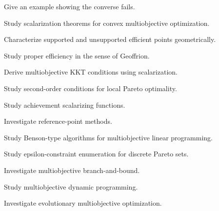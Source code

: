 \begin{exercise}[4]
Give an example showing the converse fails.
\end{exercise}

\begin{exercise}[4]
Study scalarization theorems for convex multiobjective optimization.
\end{exercise}

\begin{exercise}[4]
Characterize supported and unsupported efficient points geometrically.
\end{exercise}

\begin{exercise}[4]
Study proper efficiency in the sense of Geoffrion.
\end{exercise}

\begin{exercise}[4]
Derive multiobjective KKT conditions using scalarization.
\end{exercise}

\begin{exercise}[4]
Study second-order conditions for local Pareto optimality.
\end{exercise}

\begin{exercise}[4]
Study achievement scalarizing functions.
\end{exercise}

\begin{exercise}[4]
Investigate reference-point methods.
\end{exercise}

\begin{exercise}[4]
Study Benson-type algorithms for multiobjective linear programming.
\end{exercise}

\begin{exercise}[4]
Study epsilon-constraint enumeration for discrete Pareto sets.
\end{exercise}

\begin{exercise}[4]
Investigate multiobjective branch-and-bound.
\end{exercise}

\begin{exercise}[4]
Study multiobjective dynamic programming.
\end{exercise}

\begin{exercise}[4]
Investigate evolutionary multiobjective optimization.
\end{exercise}

